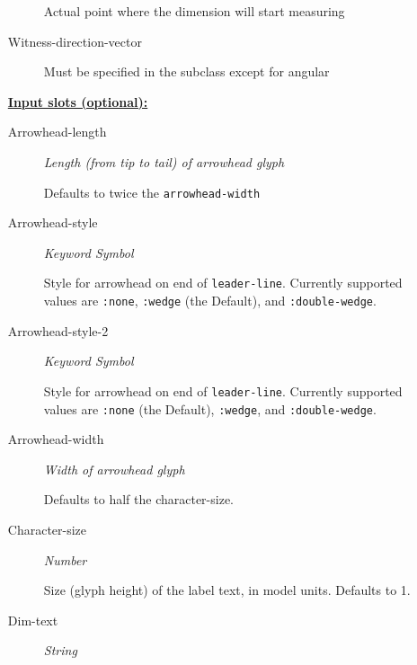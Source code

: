 \documentclass [11pt]{book}
\begin{document}
\begin{itemize}
\begin{description}
 Actual point where the dimension will start measuring




\item [Witness-direction-vector]

Must be specified in the subclass except for angular




\end{description}






\textbf{
\underline{Input slots (optional):}}

\begin{description}

\item [Arrowhead-length]
\emph{Length (from tip to tail) of arrowhead glyph}

 Defaults to twice the \texttt{arrowhead-width}




\item [Arrowhead-style]
\emph{Keyword Symbol}

 Style for arrowhead on end of \texttt{leader-line}. Currently supported values
are \texttt{:none}, \texttt{:wedge}  (the Default), and \texttt{:double-wedge}.




\item [Arrowhead-style-2]
\emph{Keyword Symbol}

 Style for arrowhead on end of \texttt{leader-line}. Currently supported values
are \texttt{:none} (the Default), \texttt{:wedge}, and \texttt{:double-wedge}.




\item [Arrowhead-width]
\emph{Width of arrowhead glyph}

 Defaults to half the character-size.




\item [Character-size]
\emph{Number}

 Size (glyph height) of the label text, in model units. Defaults to 1.




\item [Dim-text]
\emph{String}


\end{description}
\end{itemize}
\end{document}
